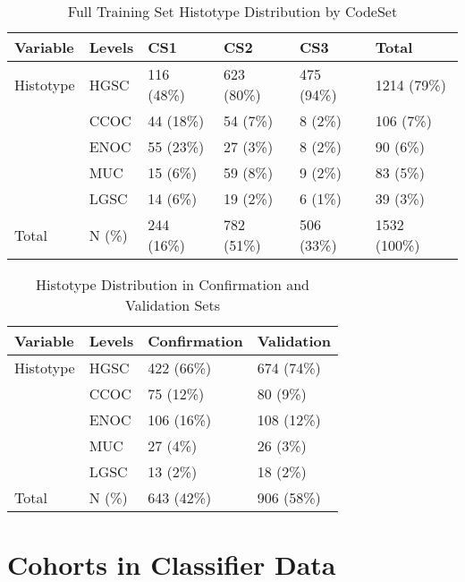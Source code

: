 \documentclass[
]{report}
\begin{document}
\begin{table}

\caption{\label{tab:train-hist-codeset}Full Training Set Histotype Distribution by CodeSet}
\centering
\begin{tabular}[t]{l|l|l|l|l|l}
\hline
Variable & Levels & CS1 & CS2 & CS3 & Total\\
\hline
Histotype & HGSC & 116 (48\%) & 623 (80\%) & 475 (94\%) & 1214 (79\%)\\
\hline
 & CCOC & 44 (18\%) & 54 (7\%) & 8 (2\%) & 106 (7\%)\\
\hline
 & ENOC & 55 (23\%) & 27 (3\%) & 8 (2\%) & 90 (6\%)\\
\hline
 & MUC & 15 (6\%) & 59 (8\%) & 9 (2\%) & 83 (5\%)\\
\hline
 & LGSC & 14 (6\%) & 19 (2\%) & 6 (1\%) & 39 (3\%)\\
\hline
Total & N (\%) & 244 (16\%) & 782 (51\%) & 506 (33\%) & 1532 (100\%)\\
\hline
\end{tabular}
\end{table}

\begin{table}

\caption{\label{tab:hist-conf-val}Histotype Distribution in Confirmation and Validation Sets}
\centering
\begin{tabular}[t]{l|l|l|l}
\hline
Variable & Levels & Confirmation & Validation\\
\hline
Histotype & HGSC & 422 (66\%) & 674 (74\%)\\
\hline
 & CCOC & 75 (12\%) & 80 (9\%)\\
\hline
 & ENOC & 106 (16\%) & 108 (12\%)\\
\hline
 & MUC & 27 (4\%) & 26 (3\%)\\
\hline
 & LGSC & 13 (2\%) & 18 (2\%)\\
\hline
Total & N (\%) & 643 (42\%) & 906 (58\%)\\
\hline
\end{tabular}
\end{table}

\hypertarget{cohorts-in-classifier-data}{%
\section{Cohorts in Classifier Data}\label{cohorts-in-classifier-data}}
\end{document}
